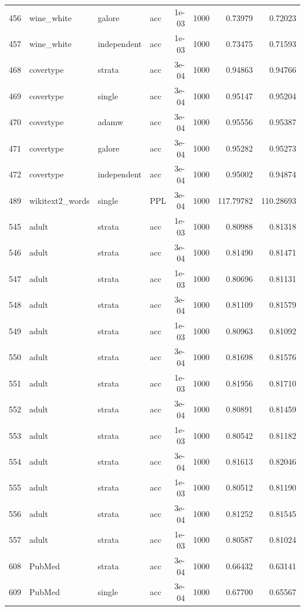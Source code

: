 \begin{longtable}{rlllrrrr}
456 & wine\_white & galore & acc & 1e-03 & 1000 & 0.73979 & 0.72023 \\
457 & wine\_white & independent & acc & 1e-03 & 1000 & 0.73475 & 0.71593 \\
\rowcolor{oursbg}
468 & covertype & strata & acc & 3e-04 & 1000 & 0.94863 & 0.94766 \\
469 & covertype & single & acc & 3e-04 & 1000 & 0.95147 & 0.95204 \\
470 & covertype & adamw & acc & 3e-04 & 1000 & 0.95556 & 0.95387 \\
471 & covertype & galore & acc & 3e-04 & 1000 & 0.95282 & 0.95273 \\
472 & covertype & independent & acc & 3e-04 & 1000 & 0.95002 & 0.94874 \\
489 & wikitext2\_words & single & PPL & 3e-04 & 1000 & 117.79782 & 110.28693 \\
\rowcolor{oursbg}
545 & adult & strata & acc & 1e-03 & 1000 & 0.80988 & 0.81318 \\
546 & adult & strata & acc & 3e-04 & 1000 & 0.81490 & 0.81471 \\
\rowcolor{oursbg}
547 & adult & strata & acc & 1e-03 & 1000 & 0.80696 & 0.81131 \\
548 & adult & strata & acc & 3e-04 & 1000 & 0.81109 & 0.81579 \\
\rowcolor{oursbg}
549 & adult & strata & acc & 1e-03 & 1000 & 0.80963 & 0.81092 \\
550 & adult & strata & acc & 3e-04 & 1000 & 0.81698 & 0.81576 \\
\rowcolor{oursbg}
551 & adult & strata & acc & 1e-03 & 1000 & 0.81956 & 0.81710 \\
552 & adult & strata & acc & 3e-04 & 1000 & 0.80891 & 0.81459 \\
\rowcolor{oursbg}
553 & adult & strata & acc & 1e-03 & 1000 & 0.80542 & 0.81182 \\
554 & adult & strata & acc & 3e-04 & 1000 & 0.81613 & 0.82046 \\
\rowcolor{oursbg}
555 & adult & strata & acc & 1e-03 & 1000 & 0.80512 & 0.81190 \\
556 & adult & strata & acc & 3e-04 & 1000 & 0.81252 & 0.81545 \\
\rowcolor{oursbg}
557 & adult & strata & acc & 1e-03 & 1000 & 0.80587 & 0.81024 \\
608 & PubMed & strata & acc & 3e-04 & 1000 & 0.66432 & 0.63141 \\
609 & PubMed & single & acc & 3e-04 & 1000 & 0.67700 & 0.65567 \\

\end{longtable}
